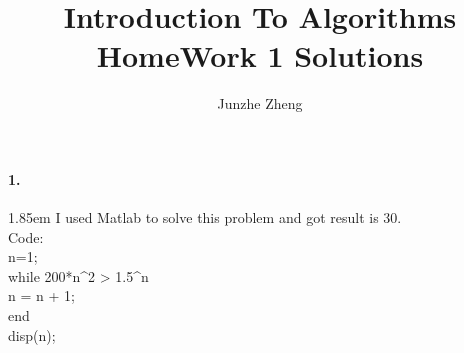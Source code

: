 \documentclass[12pt]{article}
\title{Introduction To Algorithms \\ HomeWork 1 Solutions}
\author{Junzhe Zheng}
\begin{document}
\maketitle

\paragraph{1.}
\hangindent 1.85em
\noindent
I used Matlab to solve this problem and got result is 30.
\\Code:
\\\indent n=1;
\\\indent while 200*n\^{}2 > 1.5\^{}n
\\\indent\indent    n = n + 1;
\\\indent end
\\\indent disp(n);
\end{document}

